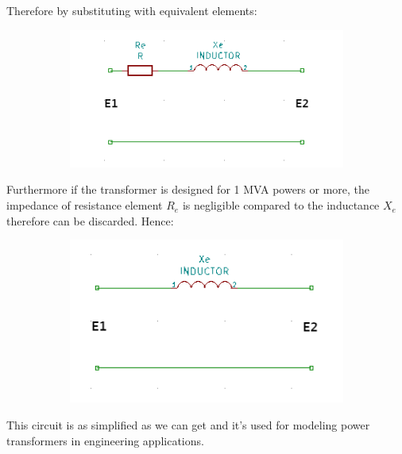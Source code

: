 \documentclass{article}
\begin{document}
	Therefore by substituting with equivalent elements:
	
	\begin{figure}[h!]
	\centering
	\begin{subfigure}[b]{0.6\linewidth}
		\includegraphics[width=\linewidth]{transformer_approx2.png}
	\end{subfigure}
	\end{figure}
	
	Furthermore if the transformer is designed for 1 MVA powers or more, the impedance of resistance element $R_e$ is negligible compared to the inductance $X_e$ therefore can be discarded. 
	Hence:
	
	\begin{figure}[h!]
	\centering
	\begin{subfigure}[b]{0.5\linewidth}
		\includegraphics[width=\linewidth]{transformer_approx3.png}
	\end{subfigure}
	\end{figure}
	
	This circuit is as simplified as we can get and it's used for modeling power transformers in engineering applications.
	
\end{document}
